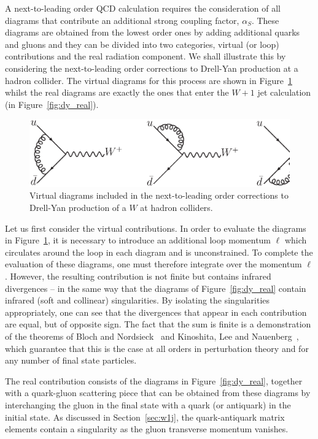\documentclass[12pt]{iopart}
\def\as{\alpha_S}
\begin{document}
A next-to-leading order QCD calculation requires the consideration of all diagrams
that contribute an additional strong coupling factor, $\as$.
These diagrams are obtained from the lowest order ones by adding additional quarks
and gluons and they can be divided into two categories, virtual (or
loop) contributions and the real radiation component. We shall illustrate this
by considering the next-to-leading order corrections to Drell-Yan
production at a hadron collider. The virtual diagrams for this process
are shown in Figure~\ref{fig:dy_virt} whilst the real diagrams are exactly
the ones that enter the $W+1$ jet calculation (in Figure~\ref{fig:dy_real}). 
%
\begin{figure}[t]
\begin{center}
\includegraphics[width=15cm]{dy_virt.ps}
\end{center}
\vspace*{-0.5cm}
\caption{Virtual diagrams included in the next-to-leading order corrections
to Drell-Yan production of a $W$ at hadron colliders.}
\label{fig:dy_virt}
\end{figure}

Let us first consider the virtual contributions. In order to evaluate the
diagrams in Figure~\ref{fig:dy_virt}, it is necessary to introduce an additional
loop momentum $\ell$ which circulates around the loop in each diagram and
is unconstrained. To complete the evaluation of these diagrams, one must
therefore integrate over the momentum $\ell$. However, the
resulting contribution is not finite but contains infrared divergences -- in the
same way that the diagrams of Figure~\ref{fig:dy_real} contain infrared (soft and collinear)
singularities. By isolating the singularities appropriately, one can see that the divergences
that appear in each contribution are equal, but of opposite sign. The fact
that the sum is finite is a demonstration of the theorems of Bloch
and Nordsieck~\cite{Bloch:1937pw} and Kinoshita, Lee and
Nauenberg~\cite{Kinoshita:1962ur,Lee:1964is},
which guarantee that this is the case at all orders in perturbation theory and
for any number of final state particles.

The real contribution consists of the diagrams in Figure~\ref{fig:dy_real},
together with a quark-gluon scattering piece that can be obtained from these
diagrams by interchanging the gluon in the final state with a quark (or
antiquark) in the initial state. As discussed in Section~\ref{sec:w1j}, the
quark-antiquark matrix elements contain a singularity as the gluon transverse
momentum vanishes.
\end{document}
